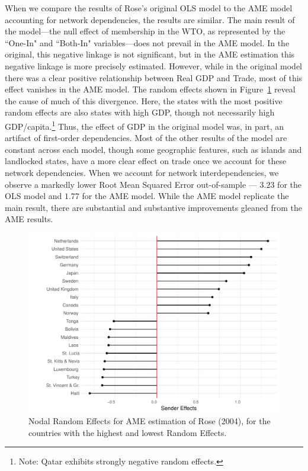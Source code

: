When we compare the results of Rose's original OLS model to the AME model accounting for network dependencies, the results are similar. The main result of the model---the null effect of membership in the WTO, as represented by the ``One-In" and ``Both-In" variables---does not prevail in the AME model. In the original, this negative linkage is not significant, but in the AME estimation this negative linkage is more precisely estimated. However, while in the original model there was a clear positive relationship between Real GDP and Trade, most of this effect vanishes in the AME model. The random effects shown in Figure~\ref{fig:roser} reveal the cause of much of this divergence. Here, the states with the most positive random effects are also states with high GDP, though not necessarily high GDP/capita.\footnote{Note: Qatar exhibits strongly negative random effects.} Thus, the effect of GDP in the original model was, in part, an artifact of first-order dependencies. Most of the other results of the model are constant across each model, though some geographic features, such as islands and landlocked states, have a more clear effect on trade once we account for these network dependencies. When we account for network interdependencies, we observe a markedly lower Root Mean Squared Error out-of-sample --- $3.23$ for the OLS model and $1.77$ for the AME model. While the AME model replicate the main result, there are substantial and substantive improvements gleaned from the AME results.

\begin{figure}
\includegraphics[width=\textwidth]{rose_aeff_top10.pdf}
 \caption{Nodal Random Effects for AME estimation of Rose (2004), for the countries with the highest and lowest Random Effects.}\label{fig:roser}
\end{figure}
\FloatBarrier

